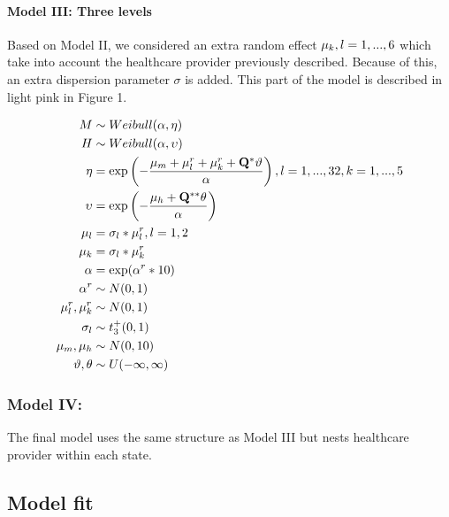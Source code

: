 \documentclass[10pt,letterpaper]{article}
\begin{document}
\hypertarget{model-iii-three-levels}{%
\paragraph{Model III: Three levels}\label{model-iii-three-levels}}

Based on Model II, we considered an extra random effect
\(\mathbf{\mu}_k, \space l=1,...,6\) which take into account the
healthcare provider previously described. Because of this, an extra
dispersion parameter \(\sigma\) is added. This part of the model is
described in light pink in Figure 1.

\[
\begin{aligned}
 M   &\sim Weibull(\alpha,\mathbf{\eta})\\
 H  &\sim Weibull(\alpha,\mathbf{\upsilon}) \\
 \mathbf{\eta} &= \exp \left(-\frac{\mu_m+\mathbf{\mu}_l^r+\mathbf{\mu}_k^r+\mathbf{Q}^*\mathbf{\vartheta}}{\alpha} \right),\space\space l=1,...,32,\space k=1,...,5\\
 \mathbf{\upsilon} &= \exp\left(-\frac{\mu_h+\mathbf{Q}^{**}\mathbf{\theta}}{\alpha}\right) \\
  \mathbf{\mu}_l&=\sigma_l*\mathbf{\mu}_l^r, \space\space l=1,2 \\
 \mathbf{\mu}_k&=\sigma_l*\mathbf{\mu}_k^r \\
 \alpha&=\exp(\alpha^r*10) \\
 \alpha^r&\sim N(0,1) \\
 \mu^r_l,\mu^r_k &\sim N(0,1) \\
 \sigma_l&\sim t^+_3(0,1) \\
 \mu_m,\mu_h &\sim N(0,10) \\
 \mathbf{\vartheta},\mathbf{\theta} &\sim U(-\infty,\infty) \\
\end{aligned}
\]

\hypertarget{model-iv}{%
\subsubsection{Model IV:}\label{model-iv}}

The final model uses the same structure as Model III but nests
healthcare provider within each state.

\hypertarget{model-fit}{%
\subsection{Model fit}\label{model-fit}}
\end{document}
